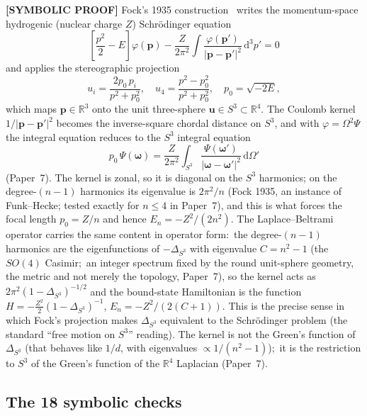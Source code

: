 \documentclass[aps,pra,twocolumn,superscriptaddress,longbibliography]{revtex4-2}
\begin{document}
\textbf{[SYMBOLIC PROOF]} Fock's 1935 construction~\cite{fock1935} writes the momentum-space
hydrogenic (nuclear charge $Z$) Schr\"odinger equation
\begin{equation}
\left[ \frac{p^2}{2} - E \right] \varphi(\mathbf{p})
- \frac{Z}{2\pi^2} \int \frac{\varphi(\mathbf{p}')}{|\mathbf{p} - \mathbf{p}'|^2}\,
\mathrm{d}^3 p' = 0
\end{equation}
and applies the stereographic projection
\begin{equation}
u_i = \frac{2 p_0 \, p_i}{p^2 + p_0^2}, \quad
u_4 = \frac{p^2 - p_0^2}{p^2 + p_0^2}, \quad
p_0 = \sqrt{-2 E},
\end{equation}
which maps $\mathbf{p} \in \mathbb{R}^3$ onto the unit three-sphere
$\mathbf{u} \in S^3 \subset \mathbb{R}^4$.  The Coulomb kernel
$1/|\mathbf{p} - \mathbf{p}'|^2$ becomes the inverse-square chordal
distance on $S^3$, and with $\varphi = \Omega^2\Psi$ the integral equation
reduces to the $S^3$ integral equation
\begin{equation}
p_0\, \Psi(\boldsymbol{\omega}) = \frac{Z}{2\pi^2}\int_{S^3}
\frac{\Psi(\boldsymbol{\omega}')}{|\boldsymbol{\omega}-\boldsymbol{\omega}'|^2}\,
\mathrm{d}\Omega'
\end{equation}
(Paper~7).  The kernel is zonal, so it is diagonal on the $S^3$ harmonics;
on the degree-$(n-1)$ harmonics its eigenvalue is $2\pi^2/n$ (Fock 1935,
an instance of Funk--Hecke; tested exactly for $n \le 4$ in Paper~7), and
this is what forces the focal length $p_0 = Z/n$ and hence
$E_n = -Z^2/(2n^2)$.  The Laplace--Beltrami operator carries the same
content in operator form:\ the degree-$(n-1)$ harmonics are the
eigenfunctions of $-\Delta_{S^3}$ with eigenvalue $C = n^2 - 1$ (the
$SO(4)$ Casimir;\ an integer spectrum fixed by the round unit-sphere
geometry, the metric and not merely the topology, Paper~7), so the
kernel acts as $2\pi^2(1-\Delta_{S^3})^{-1/2}$ and the bound-state
Hamiltonian is the function $H = -\tfrac{Z^2}{2}(1-\Delta_{S^3})^{-1}$,
$E_n = -Z^2/(2(C+1))$.  This is the precise sense in which Fock's
projection makes $\Delta_{S^3}$ equivalent to the Schr\"odinger problem
(the standard ``free motion on $S^3$'' reading).  The kernel is not the
Green's function of $\Delta_{S^3}$ (that behaves like $1/d$, with
eigenvalues $\propto 1/(n^2-1)$);\ it is the restriction to $S^3$ of the
Green's function of the $\mathbb{R}^4$ Laplacian (Paper~7).

\subsection*{The 18 symbolic checks}
\end{document}
